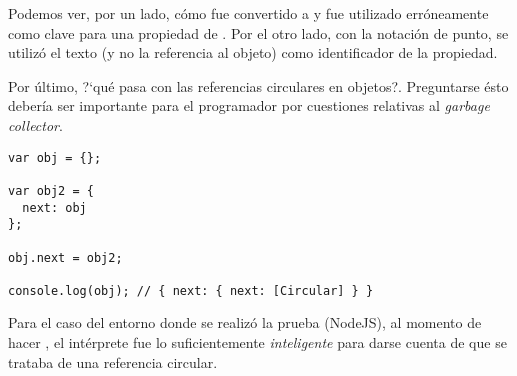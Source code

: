 Podemos ver, por un lado, cómo  fue convertido a  y fue utilizado erróneamente como clave para una propiedad de . Por el otro lado, con la notación de punto, se utilizó el texto  (y no la referencia al objeto) como identificador de la propiedad. 

Por último, ?`qué pasa con las referencias circulares en objetos?. Preguntarse ésto debería ser importante para el programador por cuestiones relativas al \textit{garbage collector}.

\begin{lstlisting}[title={Referencias circulares con objetos}]
var obj = {};

var obj2 = {
  next: obj
};

obj.next = obj2;

console.log(obj); // { next: { next: [Circular] } }​​​​​
\end{lstlisting}

Para el caso del entorno donde se realizó la prueba (NodeJS), al momento de hacer , el intérprete fue lo suficientemente \textit{inteligente} para darse cuenta de que se trataba de una referencia circular.